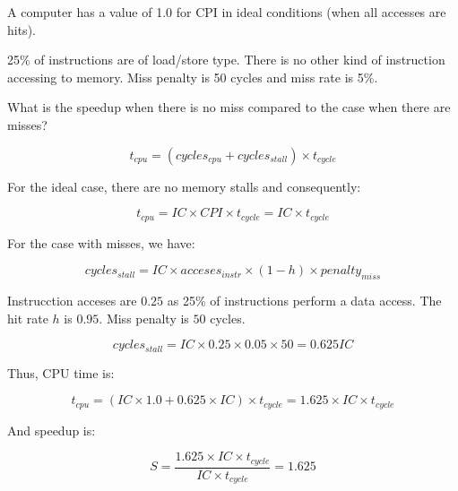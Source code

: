 \begin{acexercise}\end{acexercise}

A computer has a value of 1.0 for CPI in ideal conditions
(when all accesses are hits).

25\% of instructions are of load/store type.
There is no other kind of instruction accessing to memory.
Miss penalty is 50 cycles and miss rate is 5\%.

What is the speedup when there is no miss compared to the case
when there are misses?

\begin{acsolution}\end{acsolution}

\[
t_{cpu} = (cycles_{cpu} + cycles_{stall}) \times t_{cycle}
\]

For the ideal case, there are no memory stalls and consequently:

\[
t_{cpu} = IC \times CPI \times t_{cycle} =
IC \times t_{cycle}
\]

For the case with misses, we have:

\[
cycles_{stall} =
IC \times acceses_{instr} \times (1 - h) \times {penalty}_{miss}
\]

Instrucction acceses are $0.25$ as 25\% of instructions perform a data access.
The hit rate $h$ is $0.95$.
Miss penalty is $50$ cycles.

\[
cycles_{stall} =
IC \times 0.25 \times 0.05 \times 50 =
0.625 IC
\]

Thus, CPU time is:

\[
t_{cpu} = (IC \times 1.0 + 0.625 \times IC) \times t_{cycle} =
1.625 \times IC \times t_{cycle}
\]

And speedup is:

\[
S = \frac{1.625 \times IC \times t_{cycle}}{IC \times t_{cycle}} = 1.625
\]
